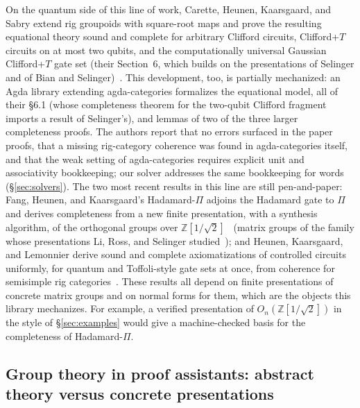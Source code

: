 On the quantum side of this line of work, Carette, Heunen, Kaarsgaard, and
Sabry extend rig groupoids with square-root maps and prove the resulting
equational theory sound and complete for arbitrary Clifford circuits,
Clifford+$T$ circuits on at most two qubits, and the computationally
universal Gaussian Clifford+$T$ gate set (their Section~6, which builds
on the presentations of Selinger and of Bian and
Selinger)~\cite{carette2024squareroots}.  This development, too, is
partially mechanized: an Agda library extending agda-categories
formalizes the equational model, all of their \S6.1 (whose completeness
theorem for the two-qubit Clifford fragment imports a result of
Selinger's), and lemmas of two of the three
larger completeness proofs.  The authors report that no errors surfaced
in the paper proofs, that a missing rig-category coherence was found in
agda-categories itself, and that the weak setting of
agda-categories requires explicit unit and associativity bookkeeping;
our  solver addresses the same bookkeeping for words
(\S\ref{sec:solvers}).  The two most recent results in this line are
still pen-and-paper: Fang, Heunen, and Kaarsgaard's
Hadamard-$\Pi$ adjoins the Hadamard gate to $\Pi$ and derives
completeness from a new finite presentation, with a synthesis algorithm,
of the orthogonal groups over
$\mathbb{Z}[1/\sqrt2]$~\cite{fang2026hadamard} (matrix groups of
the family whose presentations Li, Ross, and Selinger
studied~\cite{li2021on}); and Heunen, Kaarsgaard, and Lemonnier derive
sound and complete axiomatizations of controlled circuits uniformly, for
quantum and Toffoli-style gate sets at once, from coherence for
semisimple rig categories~\cite{heunen2026onerig}.  These results all
depend on finite presentations of concrete matrix
groups and on normal forms for them, which are the objects this
library mechanizes.  For example, a verified presentation of
$O_n(\mathbb{Z}[1/\sqrt2])$ in the style of \S\ref{sec:examples} would
give a machine-checked basis for the completeness of Hadamard-$\Pi$.

\subsection{Group theory in proof assistants: abstract theory versus concrete presentations}\label{sec:rel-gt}

